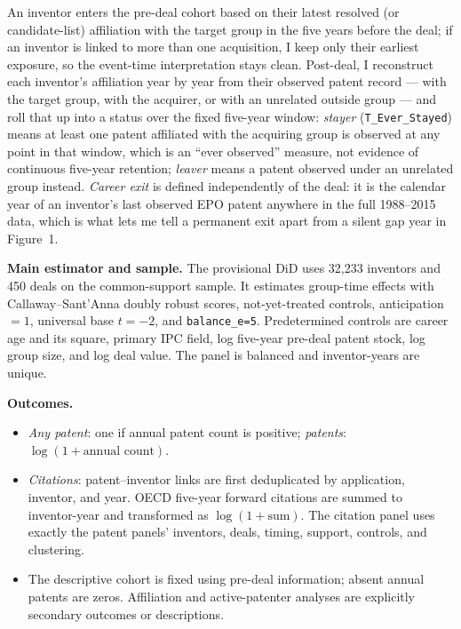 \documentclass[10pt]{article}
\begin{document}
An inventor enters the pre-deal cohort based on their latest resolved (or candidate-list) affiliation with the target group in the five years before the deal; if an inventor is linked to more than one acquisition, I keep only their earliest exposure, so the event-time interpretation stays clean. Post-deal, I reconstruct each inventor's affiliation year by year from their observed patent record --- with the target group, with the acquirer, or with an unrelated outside group --- and roll that up into a status over the fixed five-year window: \emph{stayer} (\texttt{T\_Ever\_Stayed}) means at least one patent affiliated with the acquiring group is observed at any point in that window, which is an ``ever observed'' measure, not evidence of continuous five-year retention; \emph{leaver} means a patent observed under an unrelated group instead. \emph{Career exit} is defined independently of the deal: it is the calendar year of an inventor's last observed EPO patent anywhere in the full 1988--2015 data, which is what lets me tell a permanent exit apart from a silent gap year in Figure~1.

\vspace{4pt}
\textbf{Main estimator and sample.} The provisional DiD uses 32,233 inventors and 450 deals on the common-support sample. It estimates group-time effects with Callaway--Sant'Anna doubly robust scores, not-yet-treated controls, anticipation $=1$, universal base $t=-2$, and \texttt{balance\_e=5}. Predetermined controls are career age and its square, primary IPC field, log five-year pre-deal patent stock, log group size, and log deal value. The panel is balanced and inventor-years are unique.

\textbf{Outcomes.}
\begin{itemize}
  \item \emph{Any patent}: one if annual patent count is positive; \emph{patents}: $\log(1+\text{annual count})$.
  \item \emph{Citations}: patent--inventor links are first deduplicated by application, inventor, and year. OECD five-year forward citations are summed to inventor-year and transformed as $\log(1+\text{sum})$. The citation panel uses exactly the patent panels' inventors, deals, timing, support, controls, and clustering.
  \item The descriptive cohort is fixed using pre-deal information; absent annual patents are zeros. Affiliation and active-patenter analyses are explicitly secondary outcomes or descriptions.
\end{itemize}
\end{document}
